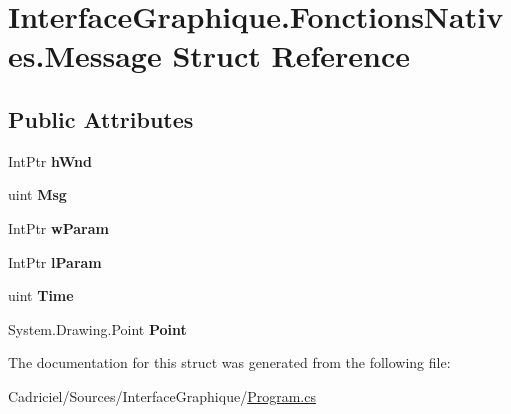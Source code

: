 \hypertarget{struct_interface_graphique_1_1_fonctions_natives_1_1_message}{}\section{Interface\+Graphique.\+Fonctions\+Natives.\+Message Struct Reference}
\label{struct_interface_graphique_1_1_fonctions_natives_1_1_message}
\subsection*{Public Attributes}
\begin{DoxyCompactItemize}
\item 
Int\+Ptr {\bfseries h\+Wnd}
\item 
uint {\bfseries Msg}
\item 
Int\+Ptr {\bfseries w\+Param}
\item 
Int\+Ptr {\bfseries l\+Param}
\item 
uint {\bfseries Time}
\item 
System.\+Drawing.\+Point {\bfseries Point}
\end{DoxyCompactItemize}


The documentation for this struct was generated from the following file\+:\begin{DoxyCompactItemize}
\item 
Cadriciel/\+Sources/\+Interface\+Graphique/\hyperlink{_program_8cs}{Program.\+cs}\end{DoxyCompactItemize}
